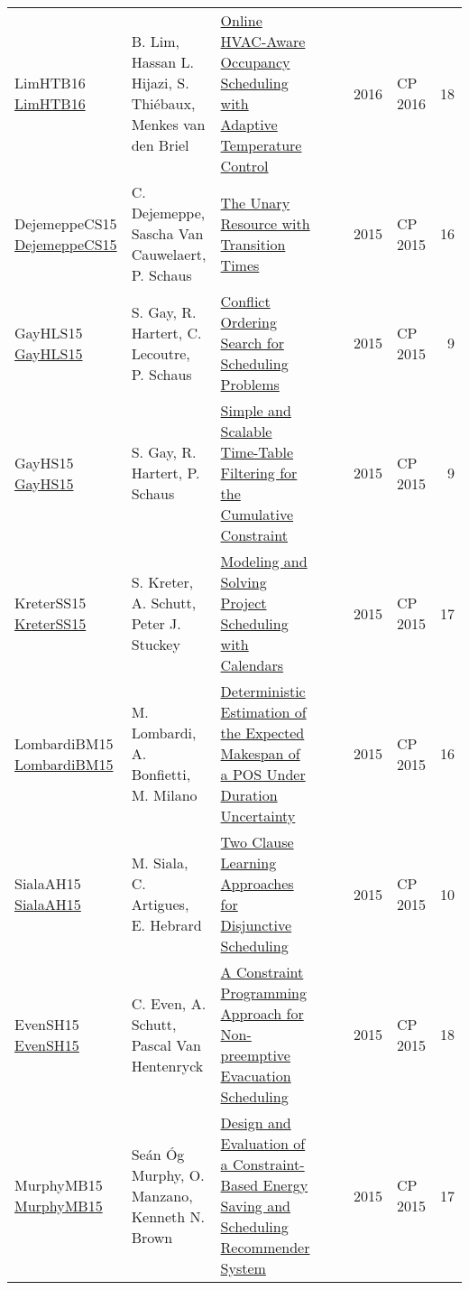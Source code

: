 {\begin{longtable}{p{3cm}p{6cm}p{7cm}rrrp{3cm}r}
LimHTB16 \href{https://doi.org/10.1007/978-3-319-44953-1\_43}{LimHTB16} & B. Lim, Hassan L. Hijazi, S. Thi{\'{e}}baux, Menkes van den Briel & \href{papers/LimHTB16.pdf}{Online HVAC-Aware Occupancy Scheduling with Adaptive Temperature Control} &  & \cite{LimHTB16} & 2016 & CP 2016 & 18\\
DejemeppeCS15 \href{https://doi.org/10.1007/978-3-319-23219-5\_7}{DejemeppeCS15} & C. Dejemeppe, Sascha Van Cauwelaert, P. Schaus & \href{papers/DejemeppeCS15.pdf}{The Unary Resource with Transition Times} &  & \cite{DejemeppeCS15} & 2015 & CP 2015 & 16\\
GayHLS15 \href{https://doi.org/10.1007/978-3-319-23219-5\_10}{GayHLS15} & S. Gay, R. Hartert, C. Lecoutre, P. Schaus & \href{papers/GayHLS15.pdf}{Conflict Ordering Search for Scheduling Problems} &  & \cite{GayHLS15} & 2015 & CP 2015 & 9\\
GayHS15 \href{https://doi.org/10.1007/978-3-319-23219-5\_11}{GayHS15} & S. Gay, R. Hartert, P. Schaus & \href{papers/GayHS15.pdf}{Simple and Scalable Time-Table Filtering for the Cumulative Constraint} &  & \cite{GayHS15} & 2015 & CP 2015 & 9\\
KreterSS15 \href{https://doi.org/10.1007/978-3-319-23219-5\_19}{KreterSS15} & S. Kreter, A. Schutt, Peter J. Stuckey & \href{papers/KreterSS15.pdf}{Modeling and Solving Project Scheduling with Calendars} &  & \cite{KreterSS15} & 2015 & CP 2015 & 17\\
LombardiBM15 \href{https://doi.org/10.1007/978-3-319-23219-5\_20}{LombardiBM15} & M. Lombardi, A. Bonfietti, M. Milano & \href{papers/LombardiBM15.pdf}{Deterministic Estimation of the Expected Makespan of a {POS} Under Duration Uncertainty} &  & \cite{LombardiBM15} & 2015 & CP 2015 & 16\\
SialaAH15 \href{https://doi.org/10.1007/978-3-319-23219-5\_28}{SialaAH15} & M. Siala, C. Artigues, E. Hebrard & \href{papers/SialaAH15.pdf}{Two Clause Learning Approaches for Disjunctive Scheduling} &  & \cite{SialaAH15} & 2015 & CP 2015 & 10\\
EvenSH15 \href{https://doi.org/10.1007/978-3-319-23219-5\_40}{EvenSH15} & C. Even, A. Schutt, Pascal Van Hentenryck & \href{papers/EvenSH15.pdf}{A Constraint Programming Approach for Non-preemptive Evacuation Scheduling} &  & \cite{EvenSH15} & 2015 & CP 2015 & 18\\
MurphyMB15 \href{https://doi.org/10.1007/978-3-319-23219-5\_47}{MurphyMB15} & Se{\'{a}}n {\'{O}}g Murphy, O. Manzano, Kenneth N. Brown & \href{papers/MurphyMB15.pdf}{Design and Evaluation of a Constraint-Based Energy Saving and Scheduling Recommender System} &  & \cite{MurphyMB15} & 2015 & CP 2015 & 17\\

\end{longtable}}
